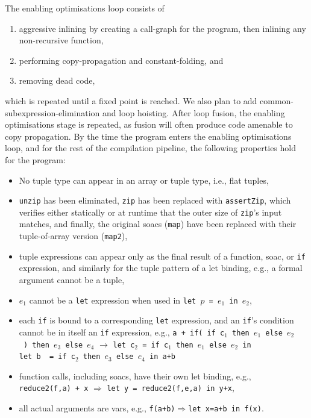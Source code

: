 \documentclass{sigplanconf}  %
\begin{document}
The enabling optimisations loop consists of
\begin{enumerate}
\item aggressive inlining by creating a call-graph for the program,
  then inlining any non-recursive function,
\item performing copy-propagation and constant-folding, and
\item removing dead code,
\end{enumerate}
which is repeated until a fixed point is reached.  We also plan to add
common-subexpression-elimination and loop hoisting.  After loop
fusion, the enabling optimisations stage is repeated, as fusion will
often produce code amenable to copy propagation.  By the time the
program enters the enabling optimisations loop, and for the rest of
the compilation pipeline, the following properties hold for the
program:

\begin{itemize}
\item No tuple type can appear in an array or tuple type, i.e., flat tuples,
\item {\tt unzip} has been eliminated, {\tt zip} has been
  replaced with {\tt assertZip}, which verifies either
  statically or at runtime that the outer size of {\tt zip}'s
  input matches, and finally, the original {\sc soac}s ({\tt map})
  have been replaced with their tuple-of-array version ({\tt map2}),
\item tuple expressions can appear only as the final result of
  a function, {\sc soac}, or {\tt if} expression, and similarly
  for the tuple pattern of a let binding, e.g., a formal argument
  cannot be a tuple,
\item %
  $e_1$ cannot be a {\tt let} expression when used 
  in {\tt let~$p$~=~$e_1$~in~$e_2$},
\item each {\tt if} is bound to a corresponding {\tt let} expression, and an
  {\tt if}'s condition cannot be in itself an {\tt if} expression, e.g.,
  {\tt a~+~if(~if~c$_1$~then~$e_1$~else~$e_2$~)~then~$e_3$~else~$e_4$} $\rightarrow$
  {\tt let~c$_2$~=~if~c$_1$~then~$e_1$~else~$e_2$~in}\\
  {\tt let~b~~=~if~c$_2$~then~$e_3$~else~$e_4$~in~a+b}
\item function calls, including {\sc soac}s, have their own let binding,
  e.g., {\tt reduce2(f,a)~+~x} $\Rightarrow$
  {\tt let~y~=~reduce2(f,e,a)~in~y+x},
\item all actual arguments are vars,
  e.g., {\tt f(a+b)}$\Rightarrow${\tt let~x=a+b~in~f(x)}.
\end{itemize}
\end{document}
